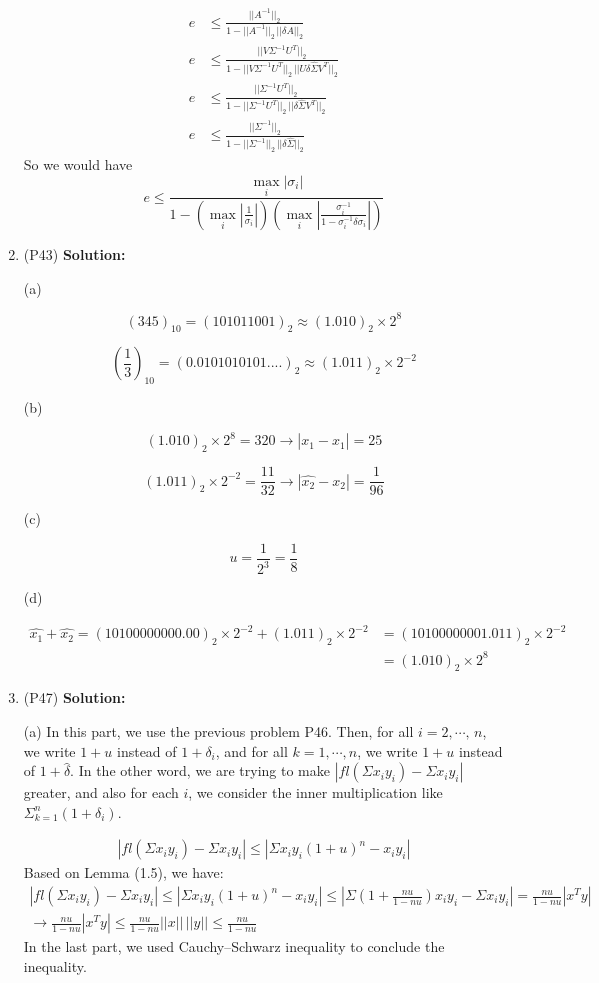 \documentclass[12pt]{article}
\begin{document}
\begin{enumerate}[leftmargin=\labelsep]
\begin{align}
	e &\leq \frac{||A^{-1}||_2}{1 - ||A^{-1}||_2\,||\delta A||_2}\\e &\leq \frac{||V\Sigma^{-1}U^{T}||_2}{1 - ||V\Sigma^{-1}U^{T}||_2\,||U\delta\hat{\Sigma} V^{T}||_2}
	\\ e &\leq \frac{||\Sigma^{-1}U^{T}||_2}{1 - ||\Sigma^{-1}U^{T}||_2\,||\delta\hat{\Sigma} V^{T}||_2}\\e &\leq \frac{||\Sigma^{-1}||_2}{1 - ||\Sigma^{-1}||_2\,||\delta\hat{\Sigma}||_2}
\end{align}
So we would have
$$e \leq \frac{\max_{i} |\sigma_i|}{1 - (\max_{i} |\frac{1}{\sigma_i}|)(\max_i |\frac{\sigma_i^{-1}}{1 - \sigma_i^{-1}\delta \sigma_i}|)}$$
\item (P43)
\textbf{Solution: }

(a) 

$$(345)_{10} = (101011001)_2 \approx (1.010)_{2} \times 2^{8}$$

$$(\frac{1}{3})_{10} = (0.0101010101....)_2 \approx (1.011)_{2} \times 2^{-2}$$

(b)

$$(1.010)_{2} \times 2^{8} = 320 \rightarrow |\hat{x_1} - x_1| = 25$$

$$(1.011)_{2} \times 2^{-2} = \frac{11}{32} \rightarrow |\hat{x_2} - x_2| = \frac{1}{96}$$

(c)

$$ u = \frac{1}{2^{3}} = \frac{1}{8}$$

(d)

\begin{align}
\hat{x_1} + \hat{x_2} = (10100000000.00)_{2} \times 2^{-2} + (1.011)_{2} \times 2^{-2} &= (10100000001.011)_{2} \times 2^{-2}\\
& = (1.010)_{2} \times 2^{8}
\end{align}

\item (P47) 
\textbf{Solution: } 

(a) In this part, we use the previous problem P46. Then, for all $i = 2,\cdots,\,n$, we write $1+u$ instead of $1+\delta_i$, and for all $k = 1,\cdots,n$, we write $1 + u$ instead of $1 + \hat{\delta}$. In the other word, we are trying to make $|fl(\Sigma x_i y_i) - \Sigma x_i y_i|$ greater, and also for each $i$, we consider the inner multiplication like $\Sigma_{k=1}^{n} (1+\delta_i)$.

\begin{align}
	|fl(\Sigma x_i y_i) - \Sigma x_i y_i| \leq |\Sigma x_i y_i (1+u)^n - x_iy_i| 
\end{align}
Based on Lemma (1.5), we have:
\begin{align}
	|fl(\Sigma x_i y_i) - \Sigma x_i y_i| \leq |\Sigma x_i y_i (1+u)^n - x_iy_i| \leq |\Sigma(1 + \frac{nu}{1-nu}) x_i y_i - \Sigma x_i y_i| = \frac{nu}{1-nu} |x^T y|\\ 
	\rightarrow \frac{nu}{1-nu} |x^T y| \leq \frac{nu}{1-nu} ||x||\,||y|| \leq \frac{nu}{1-nu}
\end{align}
In the last part, we used Cauchy–Schwarz inequality to conclude the inequality.


\end{enumerate}
\end{document}
